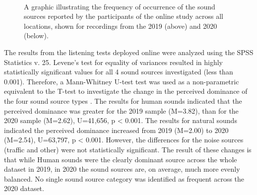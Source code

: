 \documentclass[
  authoryear,
  preprint,
  3p,
  onecolumn]{elsarticle}
\begin{document}
\begin{figure}
\begin{minipage}[t]{0.50\linewidth}
{}

\end{minipage}%
%
\begin{minipage}[t]{0.25\linewidth}
~\end{minipage}%

\caption{\label{fig-wordclo}A graphic illustrating the frequency of
occurrence of the sound sources reported by the participants of the
online study across all locations, shown for recordings from the 2019
(above) and 2020 (below).}

\end{figure}%

The results from the listening tests deployed online were analyzed using
the SPSS Statistics v. 25. Levene's test for equality of variances
resulted in highly statistically significant values for all 4 sound
sources investigated (less than 0.001). Therefore, a Mann-Whitney U-test
test was used as a non-parametric equivalent to the T-test to
investigate the change in the perceived dominance of the four sound
source types \citep{McKnight2010Mann}. The results for human sounds
indicated that the perceived dominance was greater for the 2019 sample
(M=3.82), than for the 2020 sample (M=2.62), U=41,656, p \textless{}
0.001. The results for natural sounds indicated the perceived dominance
increased from 2019 (M=2.00) to 2020 (M=2.54), U=63,797, p \textless{}
0.001. However, the differences for the noise sources (traffic and
other) were not statistically significant. The result of these changes
is that while Human sounds were the clearly dominant source across the
whole dataset in 2019, in 2020 the sound sources are, on average, much
more evenly balanced. No single sound source category was identified as
frequent across the 2020 dataset.
\end{document}
